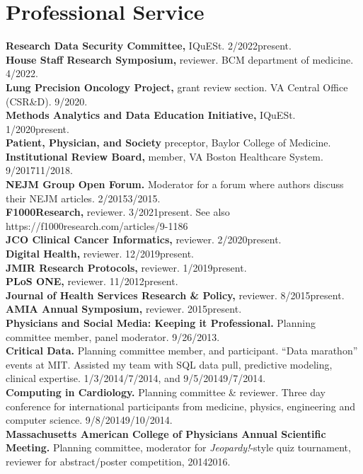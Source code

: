 \documentclass[10pt]{article}
\begin{document}
\section*{Professional Service}

\textbf{Research Data Security Committee,} IQuESt.
2/2022\ndash{}present.\\
\textbf{House Staff Research Symposium,} reviewer. BCM department of
medicine. 4/2022.\\
\textbf{Lung Precision Oncology Project,} grant review section. VA
Central Office  (CSR\&D). 9/2020.\\
\textbf{Methods Analytics and Data Education Initiative,} IQuESt.
1/2020\ndash{}present.\\
\textbf{Patient, Physician, and Society} preceptor, Baylor College of
Medicine.\\
\textbf{Institutional Review Board,} member, VA Boston Healthcare System.
9/2017\ndash{}11/2018.\\
\textbf{NEJM Group Open Forum.} Moderator for a forum where
authors discuss their NEJM articles. 2/2015\ndash{}3/2015.\\
\textbf{F1000Research,} reviewer. 3/2021\ndash{}present. See also
https://f1000research.com/articles/9-1186\\
\textbf{JCO Clinical Cancer Informatics,} reviewer. 2/2020\ndash{}present.\\
\textbf{Digital Health,} reviewer. 12/2019\ndash{}present.\\
\textbf{JMIR Research Protocols,} reviewer. 1/2019\ndash{}present.\\
\textbf{PLoS ONE,} reviewer. 11/2012\ndash{}present.\\
\textbf{Journal of Health Services Research \& Policy,} reviewer.
8/2015\ndash{}present.\\
\textbf{AMIA Annual Symposium,} reviewer. 2015\ndash{}present.\\
\textbf{Physicians and Social Media: Keeping it Professional.}
Planning committee member, panel moderator. 9/26/2013.\\
\textbf{Critical Data.} Planning committee member, and participant.
``Data marathon'' events at MIT. Assisted my team with SQL data pull,
predictive modeling, clinical expertise.
1/3/2014\ndash{}/7/2014, and 9/5/2014\ndash{}9/7/2014.\\
\textbf{Computing in Cardiology.} Planning committee \& reviewer.
Three day conference for international participants from medicine,
physics, engineering and computer science.
9/8/2014\ndash{}9/10/2014.\\
\textbf{Massachusetts American College of Physicians Annual Scientific
  Meeting.} Planning committee, moderator for \emph{Jeopardy!}-style
quiz tournament, reviewer for abstract/poster competition,
2014\ndash{}2016.
\end{document}
